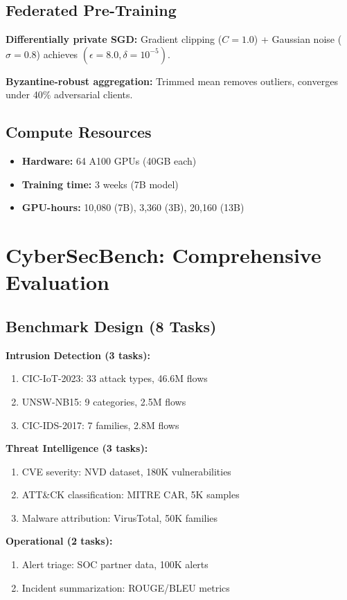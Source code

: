 \documentclass{article}
\begin{document}
\subsection{Federated Pre-Training}
\textbf{Differentially private SGD:} Gradient clipping ($C=1.0$) + Gaussian noise ($\sigma=0.8$) achieves $(\epsilon=8.0, \delta=10^{-5})$.

\textbf{Byzantine-robust aggregation:} Trimmed mean removes outliers, converges under 40\% adversarial clients.

\subsection{Compute Resources}
\begin{itemize}
\item \textbf{Hardware:} 64 A100 GPUs (40GB each)
\item \textbf{Training time:} 3 weeks (7B model)
\item \textbf{GPU-hours:} 10,080 (7B), 3,360 (3B), 20,160 (13B)
\end{itemize}

\section{CyberSecBench: Comprehensive Evaluation}

\subsection{Benchmark Design (8 Tasks)}

\textbf{Intrusion Detection (3 tasks):}
\begin{enumerate}
\item CIC-IoT-2023: 33 attack types, 46.6M flows
\item UNSW-NB15: 9 categories, 2.5M flows
\item CIC-IDS-2017: 7 families, 2.8M flows
\end{enumerate}

\textbf{Threat Intelligence (3 tasks):}
\begin{enumerate}
\item CVE severity: NVD dataset, 180K vulnerabilities
\item ATT\&CK classification: MITRE CAR, 5K samples
\item Malware attribution: VirusTotal, 50K families
\end{enumerate}

\textbf{Operational (2 tasks):}
\begin{enumerate}
\item Alert triage: SOC partner data, 100K alerts
\item Incident summarization: ROUGE/BLEU metrics
\end{enumerate}
\end{document}
